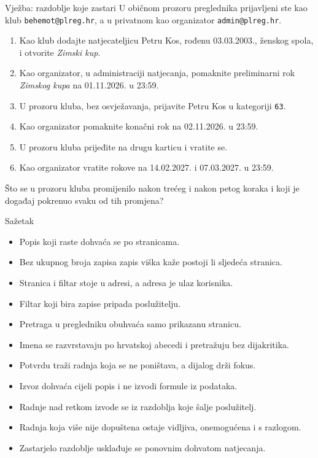 \begin{frame}{Vježba: razdoblje koje zastari}
U običnom prozoru preglednika prijavljeni ste kao klub \texttt{behemot@plreg.hr}, a u privatnom kao organizator \texttt{admin@plreg.hr}.

\vspace{0.5em}
\begin{enumerate}
  \itemsep0.3em
  \item Kao klub dodajte natjecateljicu Petru Kos, rođenu 03.03.2003., ženskog spola, i otvorite \emph{Zimski kup}.
  \item Kao organizator, u administraciji natjecanja, pomaknite preliminarni rok \emph{Zimskog kupa} na 01.11.2026. u 23:59.
  \item U prozoru kluba, bez osvježavanja, prijavite Petru Kos u kategoriji \texttt{63}.
  \item Kao organizator pomaknite konačni rok na 02.11.2026. u 23:59.
  \item U prozoru kluba prijeđite na drugu karticu i vratite se.
  \item Kao organizator vratite rokove na 14.02.2027. i 07.03.2027. u 23:59.
\end{enumerate}

\vspace{0.5em}
Što se u prozoru kluba promijenilo nakon trećeg i nakon petog koraka i koji je događaj pokrenuo svaku od tih promjena?
\end{frame}

\begin{frame}{Sažetak}
\begin{itemize}
  \itemsep0.2em
  \item Popis koji raste dohvaća se po stranicama.
  \item Bez ukupnog broja zapisa zapis viška kaže postoji li sljedeća stranica.
  \item Stranica i filtar stoje u adresi, a adresa je ulaz korisnika.
  \item Filtar koji bira zapise pripada poslužitelju.
  \item Pretraga u pregledniku obuhvaća samo prikazanu stranicu.
  \item Imena se razvrstavaju po hrvatskoj abecedi i pretražuju bez dijakritika.
  \item Potvrdu traži radnja koja se ne poništava, a dijalog drži fokus.
  \item Izvoz dohvaća cijeli popis i ne izvodi formule iz podataka.
  \item Radnje nad retkom izvode se iz razdoblja koje šalje poslužitelj.
  \item Radnja koja više nije dopuštena ostaje vidljiva, onemogućena i s razlogom.
  \item Zastarjelo razdoblje usklađuje se ponovnim dohvatom natjecanja.
\end{itemize}
\end{frame}


